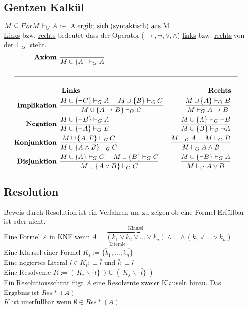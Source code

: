 \documentclass{article}
\begin{document}
		\subsection*{Gentzen Kalk\"ul}
			$M \subseteq For\\M \vdash_G A :\equiv \text{ A ergibt sich (syntaktisch) aus M}$\\
			\underline{Links} bzw. \underline{rechts} bedeutet dass der Operator ($\rightarrow, \neg, \vee, \wedge$) \underline{links} bzw. \underline{rechts} von der $\vdash_G$ steht.\\
			\begin{align*}
				\textbf{Axiom } & \frac{}{M \cup \{A\} \vdash_G A} \qquad\\\\
				\hline\\
				& \textbf{ Links} & \textbf{Rechts} & \\
				\textbf{Implikation } & \frac{M \cup \{\neg C\} \vdash_G A\quad\ M \cup \{B\} \vdash_G C}{M \cup \{A \rightarrow B\} \vdash_G C} & \frac{M \cup \{A\} \vdash_G B}{M \vdash_G A \rightarrow B}\\
				\textbf{Negation } & \frac{M \cup \{\neg B\} \vdash_G A}{M \cup \{\neg A\} \vdash_G B} & \frac{M \cup \{A\} \vdash_G \neg B}{M \cup \{B\} \vdash_G \neg A}\\
				\textbf{Konjunktion } & \frac{M \cup \{A, B\} \vdash_G C}{M \cup \{A \wedge B\} \vdash_G C} & \frac{M \vdash_G A\quad\ M \vdash_G B}{M \vdash_G A \wedge B}\\
				\textbf{Disjunktion } & \frac{M \cup \{A\} \vdash_G C\quad\ M \cup \{B\} \vdash_G C}{M \cup \{A \vee B\} \vdash_G C} & \frac{M \cup \{\neg B\} \vdash_G A}{M \vdash_G A \vee B}\\
			\end{align*}
		\subsection*{Resolution}
			Beweis durch Resolution ist ein Verfahren um zu zeigen ob eine Formel Erf\"ullbar ist oder nicht.\\
			Eine Formel $A$ in KNF wenn $A = \overbrace{(k_1 \vee k_2 \vee \ldots \vee k_n)}^{\text{Klausel}} \wedge \ldots \wedge (k_1 \vee \ldots \vee k_n)$\\
			Eine Klausel einer Formel $K_i := \{ \overbrace{k_1, \ldots, k_n}^{\text{Literale}}\}$\\
			Eine negiertes Literal $l \in K_i :\equiv \bar{l} \text{ und } \bar{\bar{l}} :\equiv l$\\
			Eine Resolvente $R := (\ K_i \backslash \{l\}\ ) \cup (\ K_j \backslash \{\bar{l}\}\ )$\\
			Ein Resolutionsschritt f\"ugt $A$ eine Resolvente zweier Klauseln hinzu. Das Ergebnis ist $Res*(A)$\\
			$K$ ist unerf\"ullbar wenn $\emptyset \in Res*(A)$\\
\end{document}

